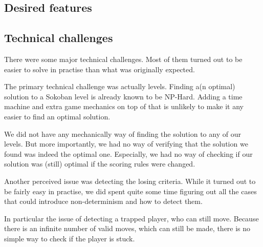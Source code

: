 \subsection{Desired features}

\subsection{Technical challenges}
There were some major technical challenges.  Most of them turned out to be
easier to solve in practise than what was originally expected.

The primary technical challenge was actually levels.  Finding a(n
optimal) solution to a Sokoban level is already known to be NP-Hard.
Adding a time machine and extra game mechanics on top of that is
unlikely to make it any easier to find an optimal solution.

We did not have any mechanically way of finding the solution to any of
our levels.  But more importantly, we had no way of verifying that the
solution we found was indeed the optimal one.  Especially, we had no
way of checking if our solution was (still) optimal if the scoring rules
were changed.

Another perceived issue was detecting the losing criteria.  While it
turned out to be fairly easy in practise, we did spent quite some time
figuring out all the cases that could introduce non-determinism and
how to detect them.

In particular the issue of detecting a trapped player, who can still
move. Because there is an infinite number of valid moves, which can
still be made, there is no simple way to check if the player is stuck.


